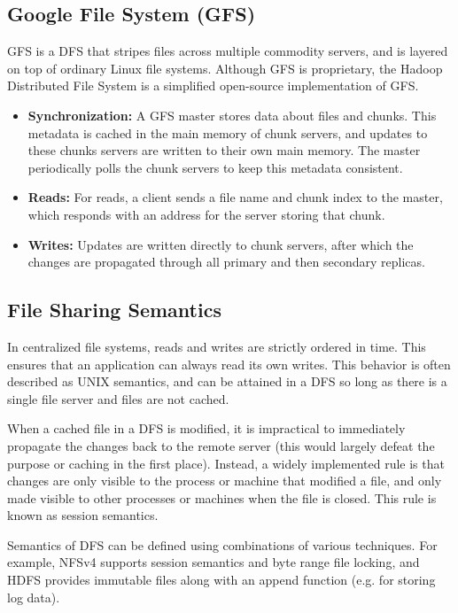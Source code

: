 \documentclass[12pt,titlepage]{article}
\begin{document}
    \subsection{Google File System (GFS)}
      GFS is a DFS that stripes files across multiple commodity servers, and is layered on top of ordinary Linux file systems. Although GFS is proprietary, the
      Hadoop Distributed File System is a simplified open-source implementation of GFS.
      \begin{itemize}
        \item \textbf{Synchronization:} A GFS master stores data about files and chunks. This metadata is cached in the main memory of chunk servers, and updates to
        these chunks servers are written to their own main memory. The master periodically polls the chunk servers to keep this metadata consistent.
        \item \textbf{Reads:} For reads, a client sends a file name and chunk index to the master, which responds with an address for the server storing that chunk.
        \item \textbf{Writes:} Updates are written directly to chunk servers, after which the changes are propagated through all primary and then secondary replicas.
      \end{itemize}

    \subsection{File Sharing Semantics}
      In centralized file systems, reads and writes are strictly ordered in time. This ensures that an application can always read its own writes. This behavior is
      often described as UNIX semantics, and can be attained in a DFS so long as there is a single file server and files are not cached.

      When a cached file in a DFS is modified, it is impractical to immediately propagate the changes back to the remote server (this would largely defeat the purpose
      or caching in the first place). Instead, a widely implemented rule is that changes are only visible to the process or machine that modified a file, and only made
      visible to other processes or machines when the file is closed. This rule is known as session semantics.

      Semantics of DFS can be defined using combinations of various techniques. For example, NFSv4 supports session semantics and byte range file locking, and HDFS
      provides immutable files along with an append function (e.g. for storing log data).
\end{document}
